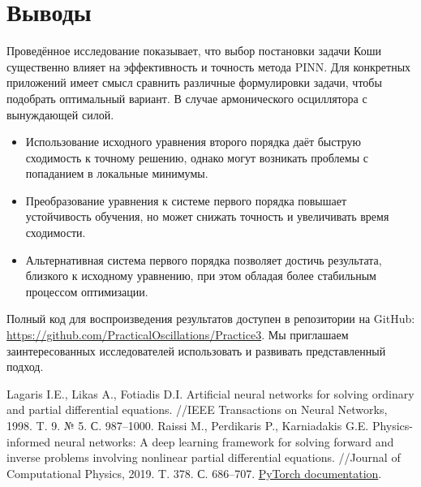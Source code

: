 \documentclass[12pt,a4paper]{article}
\begin{document}
\newpage
\section{Выводы}
Проведённое исследование показывает, что выбор постановки задачи Коши существенно влияет на эффективность и точность метода PINN.
Для конкретных приложений имеет смысл сравнить различные формулировки задачи, чтобы подобрать оптимальный вариант. В случае армонического осциллятора с вынуждающей силой.
\begin{itemize}
    \item Использование исходного уравнения второго порядка даёт быструю сходимость к точному решению, однако могут возникать проблемы с попаданием в локальные минимумы.
    \item Преобразование уравнения к системе первого порядка повышает устойчивость обучения, но может снижать точность и увеличивать время сходимости.
    \item Альтернативная система первого порядка позволяет достичь результата, близкого к исходному уравнению, при этом обладая более стабильным процессом оптимизации.
\end{itemize}
Полный код для воспроизведения результатов доступен в репозитории на GitHub:\\
\href{https://github.com/PracticalOscillations/Practice3}{https://github.com/PracticalOscillations/Practice3}.
Мы приглашаем заинтересованных исследователей использовать и развивать представленный подход.

\begin{thebibliography}{99}
 Lagaris I.E., Likas A., Fotiadis D.I. Artificial neural networks for solving ordinary and partial differential equations. //IEEE Transactions on Neural Networks, 1998. T. 9. № 5. С. 987–1000.
 Raissi M., Perdikaris P., Karniadakis G.E. Physics-informed neural networks: A deep learning framework for solving forward and inverse problems involving nonlinear partial differential equations. //Journal of Computational Physics, 2019. T. 378. С. 686–707.
 \href{https://pytorch.org/docs/stable/index.html}{PyTorch documentation}.
\end{thebibliography}
\end{document}
